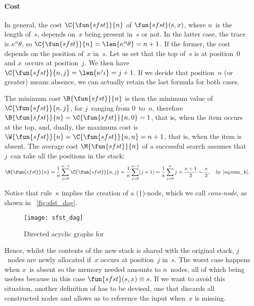 \paragraph{Cost}

In general, the cost
\(\C{\fun{sfst}}{n}\) of
\(\fun{sfst}(s,x)\), where \(n\)~is the length of~\(s\), depends
on~\(x\) being present in~\(s\) or not. In the latter case, the trace
is \(\kappa^n\theta\), so \(\C{\fun{sfst}}{n} = \len{\kappa^n\theta} =
n + 1\). If the former, the cost depends on the position of~\(x\)
in~\(s\). Let us set that the top of~\(s\) is at position~\(0\) and
\(x\)~occurs at position~\(j\). We then have \(\C{\fun{sfst}}{n,j} =
\len{\kappa^j\iota} = j + 1\). If we
decide that position~\(n\) (or greater) means absence, we can actually
retain the last formula for both cases.

The minimum cost \(\B{\fun{sfst}}{n}\)
is then the minimum value
of \(\C{\fun{sfst}}{n,j}\), for \(j\)~ranging from \(0\)~to~\(n\),
therefore \(\B{\fun{sfst}}{n} = \C{\fun{sfst}}{n,0} = 1\), that is,
when the item occurs at the top, and, dually, the maximum
cost
is \(\W{\fun{sfst}}{n} =
\C{\fun{sfst}}{n,n} = n + 1\), that is, when the item is absent. The
average cost
\(\M{\fun{sfst}}{n}\) of a successful search assumes that \(j\)~can
take all the positions in the stack:
\begin{equation*}
  \M{\fun{sfst}}{n} = \frac{1}{n}\sum_{j=0}^{n-1}\C{\fun{sfst}}{n,j} =
  \frac{1}{n}\sum_{j=0}^{n-1}(j+1) = \frac{1}{n}\sum_{j=0}^{n}j
  = \frac{n+1}{2} \sim \frac{n}{2}, \quad \text{by}~\eqref{eq:sum_k}.
\end{equation*}

Notice that rule~\(\kappa\) implies the creation of a
(\texttt{|})\hyp{}node, which we call
\emph{cons\hyp{}node}, as shown in
\fig~\vref{fig:sfst_dag}.
\begin{figure}
\centering
\texttt{[image: sfst\_dag]}
\caption{Directed acyclic graphs for }
\label{fig:sfst_dag}
\end{figure}
Hence, whilst the contents of the new stack is shared with the
original stack, \(j\)~nodes are newly allocated if~\(x\) occurs at
position~\(j\) in~\(s\). The worst case happens when \(x\)~is absent
so the memory needed amounts to
\(n\)~nodes, all of which being useless because in this case
\(\fun{sfst}(s,x) \equiv s\). If we want to avoid this situation,
another definition of  has to be devised, one that
discards all constructed nodes and allows us to reference the input
when~\(x\) is missing.

